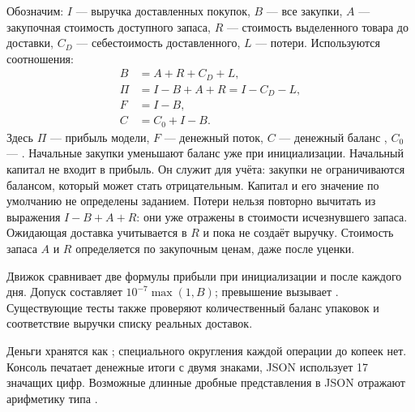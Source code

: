 Обозначим: $I$ --- выручка доставленных покупок, $B$ --- все закупки,
$A$ --- закупочная стоимость доступного запаса, $R$ --- стоимость выделенного
товара до доставки, $C_D$ --- себестоимость доставленного, $L$ --- потери.
Используются соотношения:
\begin{align}
  B &= A+R+C_D+L,\\
  \Pi &= I-B+A+R = I-C_D-L,\\
  F &= I-B,\\
  C &= C_0+I-B.
\end{align}
Здесь $\Pi$ --- прибыль модели, $F$ --- денежный поток, $C$ --- денежный баланс
, $C_0$ --- . Начальные закупки
уменьшают баланс уже при инициализации. Начальный капитал не входит в прибыль.
Он служит для учёта: закупки не ограничиваются балансом, который может стать
отрицательным. Капитал и его значение по умолчанию не определены заданием.
Потери нельзя повторно
вычитать из выражения $I-B+A+R$: они уже отражены в стоимости исчезнувшего
запаса. Ожидающая доставка учитывается в $R$ и пока не создаёт выручку.
Стоимость запаса $A$ и $R$ определяется по закупочным ценам, даже после уценки.

Движок сравнивает две формулы прибыли при инициализации и после каждого дня.
Допуск составляет $10^{-7}\max(1,B)$; превышение вызывает
. Существующие тесты также проверяют количественный
баланс упаковок и соответствие выручки списку реальных доставок.

Деньги хранятся как ; специального округления каждой операции
до копеек нет. Консоль печатает денежные итоги с двумя знаками, JSON использует
17 значащих цифр. Возможные длинные дробные представления в JSON отражают
арифметику типа .

